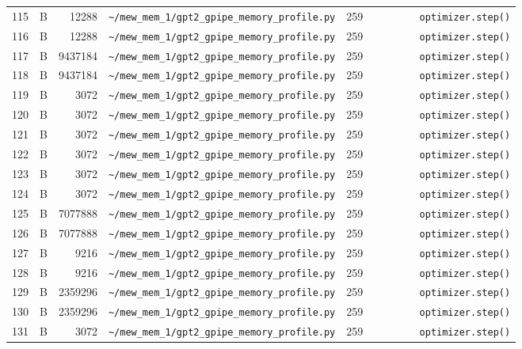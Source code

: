 \documentclass{article}
\begin{document}
\begin{longtable}{r l r p{6.5cm} r p{7.0cm}}
115 & B & 12288 & \lstinline|~/mew_mem_1/gpt2_gpipe_memory_profile.py| & 259 & \lstinline|        optimizer.step()| \\
116 & B & 12288 & \lstinline|~/mew_mem_1/gpt2_gpipe_memory_profile.py| & 259 & \lstinline|        optimizer.step()| \\
117 & B & 9437184 & \lstinline|~/mew_mem_1/gpt2_gpipe_memory_profile.py| & 259 & \lstinline|        optimizer.step()| \\
118 & B & 9437184 & \lstinline|~/mew_mem_1/gpt2_gpipe_memory_profile.py| & 259 & \lstinline|        optimizer.step()| \\
119 & B & 3072 & \lstinline|~/mew_mem_1/gpt2_gpipe_memory_profile.py| & 259 & \lstinline|        optimizer.step()| \\
120 & B & 3072 & \lstinline|~/mew_mem_1/gpt2_gpipe_memory_profile.py| & 259 & \lstinline|        optimizer.step()| \\
121 & B & 3072 & \lstinline|~/mew_mem_1/gpt2_gpipe_memory_profile.py| & 259 & \lstinline|        optimizer.step()| \\
122 & B & 3072 & \lstinline|~/mew_mem_1/gpt2_gpipe_memory_profile.py| & 259 & \lstinline|        optimizer.step()| \\
123 & B & 3072 & \lstinline|~/mew_mem_1/gpt2_gpipe_memory_profile.py| & 259 & \lstinline|        optimizer.step()| \\
124 & B & 3072 & \lstinline|~/mew_mem_1/gpt2_gpipe_memory_profile.py| & 259 & \lstinline|        optimizer.step()| \\
125 & B & 7077888 & \lstinline|~/mew_mem_1/gpt2_gpipe_memory_profile.py| & 259 & \lstinline|        optimizer.step()| \\
126 & B & 7077888 & \lstinline|~/mew_mem_1/gpt2_gpipe_memory_profile.py| & 259 & \lstinline|        optimizer.step()| \\
127 & B & 9216 & \lstinline|~/mew_mem_1/gpt2_gpipe_memory_profile.py| & 259 & \lstinline|        optimizer.step()| \\
128 & B & 9216 & \lstinline|~/mew_mem_1/gpt2_gpipe_memory_profile.py| & 259 & \lstinline|        optimizer.step()| \\
129 & B & 2359296 & \lstinline|~/mew_mem_1/gpt2_gpipe_memory_profile.py| & 259 & \lstinline|        optimizer.step()| \\
130 & B & 2359296 & \lstinline|~/mew_mem_1/gpt2_gpipe_memory_profile.py| & 259 & \lstinline|        optimizer.step()| \\
131 & B & 3072 & \lstinline|~/mew_mem_1/gpt2_gpipe_memory_profile.py| & 259 & \lstinline|        optimizer.step()| \\

\end{longtable}
\end{document}
